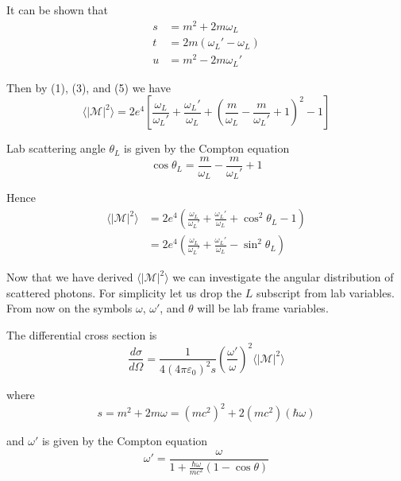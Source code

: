 It can be shown that
\begin{equation*}
\begin{aligned}
s&=m^2+2m\omega_L
\\
t&=2m(\omega_L' - \omega_L)
\\
u&=m^2-2 m \omega_L'
\end{aligned}
\tag{5}
\end{equation*}

Then by (1), (3), and (5) we have
\begin{equation*}
\langle|\mathcal{M}|^2\rangle=2e^4
\left[
\frac{\omega_L}{\omega_L'}+\frac{\omega_L'}{\omega_L}
+\left(\frac{m}{\omega_L}-\frac{m}{\omega_L'}+1\right)^2-1
\right]
\tag{6}
\end{equation*}

Lab scattering angle $\theta_L$ is given by the Compton equation
\begin{equation*}
\cos\theta_L=\frac{m}{\omega_L}-\frac{m}{\omega_L'}+1
\end{equation*}

Hence
\begin{align*}
\langle|\mathcal{M}|^2\rangle
&=2e^4\left(
\frac{\omega_L}{\omega_L'}+\frac{\omega_L'}{\omega_L}+\cos^2\theta_L-1
\right)
\\
&=2e^4\left(
\frac{\omega_L}{\omega_L'}+\frac{\omega_L'}{\omega_L}-\sin^2\theta_L
\right)
\end{align*}

Now that we have derived $\langle|\mathcal{M}|^2\rangle$
we can investigate the angular distribution of scattered photons.
For simplicity let us drop the $L$ subscript from lab variables.
From now on the symbols $\omega$, $\omega'$, and $\theta$ will be lab frame variables.

\bigskip
The differential cross section is
\begin{equation*}
\frac{d\sigma}{d\Omega}=\frac{1}{4(4\pi\varepsilon_0)^2s}
\left(\frac{\omega'}{\omega}\right)^2\langle|\mathcal{M}|^2\rangle
\end{equation*}

where
\begin{equation*}
s=m^2+2m\omega=(mc^2)^2+2(mc^2)(\hbar\omega)
\end{equation*}

and $\omega'$ is given by the Compton equation
\begin{equation*}
\omega'=\frac{\omega}{1+\frac{\hbar\omega}{mc^2}(1-\cos\theta)}
\end{equation*}

